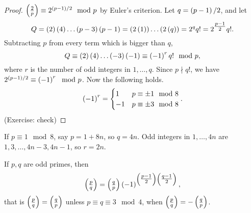\begin{proof}
$ \left( \tfrac{2}{p} \right) \equiv 2^{\left( p - 1 \right) / 2} \mod p $ by Euler's criterion. Let $ q = \left( p - 1 \right) / 2 $, and let
$$ Q = \left( 2 \right)\left( 4 \right) \dots \left( p - 3 \right)\left( p - 1 \right) = \left( 2\left( 1 \right) \right) \dots \left( 2\left( q \right) \right) = 2^qq! = 2^{\tfrac{p - 1}{2}}q!. $$
Subtracting $ p $ from every term which is bigger than $ q $,
$$ Q \equiv \left( 2 \right)\left( 4 \right) \dots \left( -3 \right)\left( -1 \right) \equiv \left( -1 \right)^rq! \mod p, $$
where $ r $ is the number of odd integers in $ 1, \dots, q $. Since $ p \nmid q! $, we have $ 2^{\left( p - 1 \right) / 2} \equiv \left( -1 \right)^r \mod p $. Now the following holds.
$$ \left( -1 \right)^r =
\begin{cases}
1 & p \equiv \pm 1 \mod 8 \\
-1 & p \equiv \pm 3 \mod 8
\end{cases}.
$$
(Exercise: check)
\end{proof}

\begin{example*}
If $ p \equiv 1 \mod 8 $, say $ p = 1 + 8n $, so $ q = 4n $. Odd integers in $ 1, \dots, 4n $ are $ 1, 3, \dots, 4n - 3, 4n - 1 $, so $ r = 2n $.
\end{example*}

\begin{theorem}
\label{thm:40}
If $ p, q $ are odd primes, then
$$ \left( \tfrac{p}{q} \right) = \left( \tfrac{q}{p} \right)\left( -1 \right)^{\left( \tfrac{p - 1}{2} \right)\left( \tfrac{q - 1}{2} \right)}, $$
that is $ \left( \tfrac{p}{q} \right) = \left( \tfrac{q}{p} \right) $ unless $ p \equiv q \equiv 3 \mod 4 $, when $ \left( \tfrac{p}{q} \right) = -\left( \tfrac{q}{p} \right) $.
\end{theorem}

